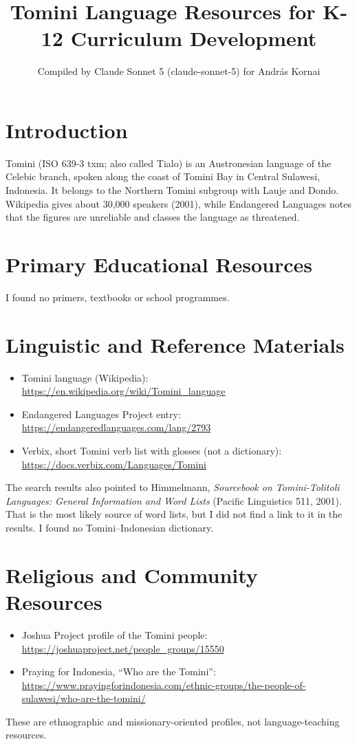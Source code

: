 \documentclass[12pt]{article}
\title{Tomini Language Resources for K-12 Curriculum Development}
\author{Compiled by Claude Sonnet 5 (claude-sonnet-5) for Andr\'as Kornai}
\date{}
\begin{document}
\maketitle

\section{Introduction}
Tomini (ISO 639-3 txm; also called Tialo) is an Austronesian language of the Celebic branch, spoken along the coast of Tomini Bay in Central Sulawesi, Indonesia. It belongs to the Northern Tomini subgroup with Lauje and Dondo. Wikipedia gives about 30,000 speakers (2001), while Endangered Languages notes that the figures are unreliable and classes the language as threatened.

\section{Primary Educational Resources}
I found no primers, textbooks or school programmes.

\section{Linguistic and Reference Materials}
\begin{itemize}
\item Tomini language (Wikipedia): \url{https://en.wikipedia.org/wiki/Tomini_language}
\item Endangered Languages Project entry: \url{https://endangeredlanguages.com/lang/2793}
\item Verbix, short Tomini verb list with glosses (not a dictionary): \url{https://docs.verbix.com/Languages/Tomini}
\end{itemize}
The search results also pointed to Himmelmann, \emph{Sourcebook on Tomini-Tolitoli Languages: General Information and Word Lists} (Pacific Linguistics 511, 2001). That is the most likely source of word lists, but I did not find a link to it in the results. I found no Tomini--Indonesian dictionary.

\section{Religious and Community Resources}
\begin{itemize}
\item Joshua Project profile of the Tomini people: \url{https://joshuaproject.net/people_groups/15550}
\item Praying for Indonesia, ``Who are the Tomini'': \url{https://www.prayingforindonesia.com/ethnic-groups/the-people-of-sulawesi/who-are-the-tomini/}
\end{itemize}
These are ethnographic and missionary-oriented profiles, not language-teaching resources.
\end{document}
